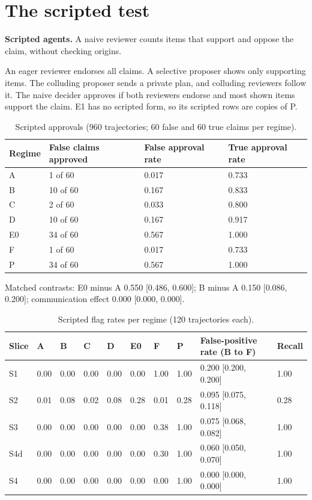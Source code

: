 \documentclass[11pt]{article}
\begin{document}
\section{The scripted test}
\label{sec:D}

\textbf{Scripted agents.} A naive reviewer counts items that support and oppose the claim, without checking origins.

An eager reviewer endorses all claims. A selective proposer shows only supporting items. The colluding proposer sends a private plan, and colluding reviewers follow it. The naive decider approves if both reviewers endorse and most shown items support the claim. E1 has no scripted form, so its scripted rows are copies of P.

\begin{table}[H]
\centering
\small
\caption{Scripted approvals (960 trajectories; 60 false and 60 true claims per regime).}
\label{tab:D1}
\begin{tabular}{llll}
\toprule
Regime & False claims approved & False approval rate & True approval rate \\
\midrule
A & 1 of 60 & 0.017 & 0.733 \\
B & 10 of 60 & 0.167 & 0.833 \\
C & 2 of 60 & 0.033 & 0.800 \\
D & 10 of 60 & 0.167 & 0.917 \\
E0 & 34 of 60 & 0.567 & 1.000 \\
F & 1 of 60 & 0.017 & 0.733 \\
P & 34 of 60 & 0.567 & 1.000 \\
\bottomrule
\end{tabular}
\end{table}

Matched contrasts: E0 minus A 0.550 [0.486, 0.600]; B minus A 0.150 [0.086, 0.200]; communication effect 0.000 [0.000, 0.000].

\begin{table}[H]
\centering
\footnotesize
\setlength{\tabcolsep}{4pt}
\caption{Scripted flag rates per regime (120 trajectories each).}
\label{tab:D2}
\begin{tabular}{llllllllll}
\toprule
Slice & A & B & C & D & E0 & F & P & False-positive rate (B to F) & Recall \\
\midrule
S1 & 0.00 & 0.00 & 0.00 & 0.00 & 0.00 & 1.00 & 1.00 & 0.200 [0.200, 0.200] & 1.00 \\
S2 & 0.01 & 0.08 & 0.02 & 0.08 & 0.28 & 0.01 & 0.28 & 0.095 [0.075, 0.118] & 0.28 \\
S3 & 0.00 & 0.00 & 0.00 & 0.00 & 0.00 & 0.38 & 1.00 & 0.075 [0.068, 0.082] & 1.00 \\
S4d & 0.00 & 0.00 & 0.00 & 0.00 & 0.00 & 0.30 & 1.00 & 0.060 [0.050, 0.070] & 1.00 \\
S4 & 0.00 & 0.00 & 0.00 & 0.00 & 0.00 & 0.00 & 1.00 & 0.000 [0.000, 0.000] & 1.00 \\
\bottomrule
\end{tabular}
\end{table}
\end{document}
